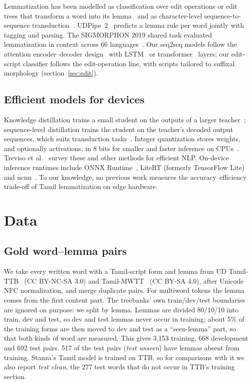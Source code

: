 \documentclass{sadhana}
\begin{document}
Lemmatization has been modelled as classification over edit operations or edit
trees that transform a word into its lemma~\cite{morfette, lemming} and as
character-level sequence-to-sequence transduction~\cite{lematus, kanerva}.
UDPipe~2~\cite{udpipe} predicts a lemma rule per word jointly with tagging and
parsing. The SIGMORPHON 2019 shared task evaluated lemmatization in context
across 66 languages~\cite{sigmorphon2019}. Our seq2seq models follow the
attention encoder--decoder design~\cite{bahdanau} with LSTM~\cite{hochreiter} or
transformer~\cite{vaswani} layers; our edit-script classifier follows the
edit-operation line, with scripts tailored to suffixal morphology
(section~\ref{sec:edit}).

\subsection{Efficient models for devices}

Knowledge distillation trains a small student on the outputs of a larger
teacher~\cite{hinton}; sequence-level distillation trains the student on the
teacher's decoded output sequences, which suits transduction
tasks~\cite{kimrush}. Integer quantization stores weights, and optionally
activations, in 8 bits for smaller and faster inference on CPUs~\cite{jacob}.
Treviso et al.~\cite{treviso} survey these and other methods for efficient NLP.
On-device inference runtimes include ONNX Runtime~\cite{onnxruntime},
LiteRT (formerly TensorFlow Lite)~\cite{litert} and ncnn~\cite{ncnn}. To our
knowledge, no previous work measures the accuracy--efficiency trade-off of
Tamil lemmatization on edge hardware.

\section{Data}
\label{sec:data}

\subsection{Gold word--lemma pairs}

We take every written word with a Tamil-script form and lemma from UD
Tamil-TTB~\cite{ttb} (CC BY-NC-SA 3.0) and Tamil-MWTT~\cite{mwtt}
(CC BY-SA 4.0), after Unicode NFC normalization, and merge duplicate pairs. For
multiword tokens the lemma comes from the first content part. The treebanks'
own train/dev/test boundaries are ignored on purpose: we split by lemma. Lemmas
are divided 80/10/10 into train, dev and test, so dev and test lemmas never
occur in training; about 5\% of the training forms are then moved to dev and
test as a ``seen-lemma'' part, so that both kinds of word are measured. This
gives 3,153 training, 668 development and 692 test pairs. 517 of the test
pairs (\emph{test unseen}) have lemmas absent from training. Stanza's Tamil
model is trained on TTB, so for comparisons with it we also report \emph{test
clean}, the 277 test words that do not occur in TTB's training section.
\end{document}
